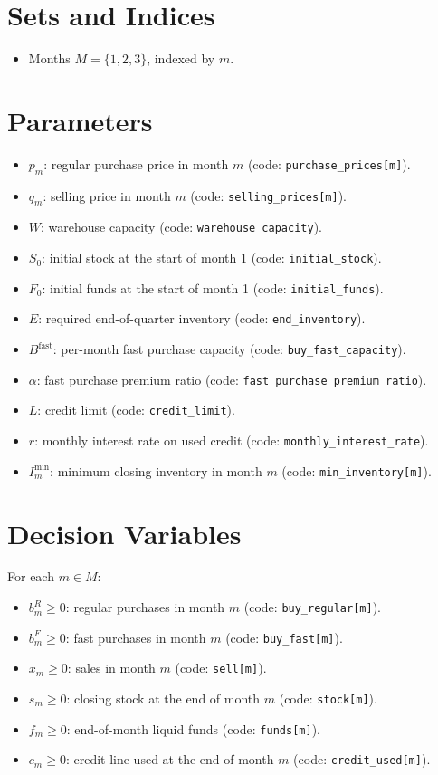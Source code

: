 \section*{Sets and Indices}

\begin{itemize}
    \item Months $M=\{1,2,3\}$, indexed by $m$.
\end{itemize}

\section*{Parameters}

\begin{itemize}
    \item $p_m$: regular purchase price in month $m$ (code: \texttt{purchase\_prices[m]}).
    \item $q_m$: selling price in month $m$ (code: \texttt{selling\_prices[m]}).
    \item $W$: warehouse capacity (code: \texttt{warehouse\_capacity}).
    \item $S_0$: initial stock at the start of month 1 (code: \texttt{initial\_stock}).
    \item $F_0$: initial funds at the start of month 1 (code: \texttt{initial\_funds}).
    \item $E$: required end-of-quarter inventory (code: \texttt{end\_inventory}).
    \item $B^{\text{fast}}$: per-month fast purchase capacity (code: \texttt{buy\_fast\_capacity}).
    \item $\alpha$: fast purchase premium ratio (code: \texttt{fast\_purchase\_premium\_ratio}).
    \item $L$: credit limit (code: \texttt{credit\_limit}).
    \item $r$: monthly interest rate on used credit (code: \texttt{monthly\_interest\_rate}).
    \item $I^{\min}_m$: minimum closing inventory in month $m$ (code: \texttt{min\_inventory[m]}).
\end{itemize}

\section*{Decision Variables}

For each $m \in M$:
\begin{itemize}
    \item $b^{R}_m \ge 0$: regular purchases in month $m$ (code: \texttt{buy\_regular[m]}).
    \item $b^{F}_m \ge 0$: fast purchases in month $m$ (code: \texttt{buy\_fast[m]}).
    \item $x_m \ge 0$: sales in month $m$ (code: \texttt{sell[m]}).
    \item $s_m \ge 0$: closing stock at the end of month $m$ (code: \texttt{stock[m]}).
    \item $f_m \ge 0$: end-of-month liquid funds (code: \texttt{funds[m]}).
    \item $c_m \ge 0$: credit line used at the end of month $m$ (code: \texttt{credit\_used[m]}).
\end{itemize}

